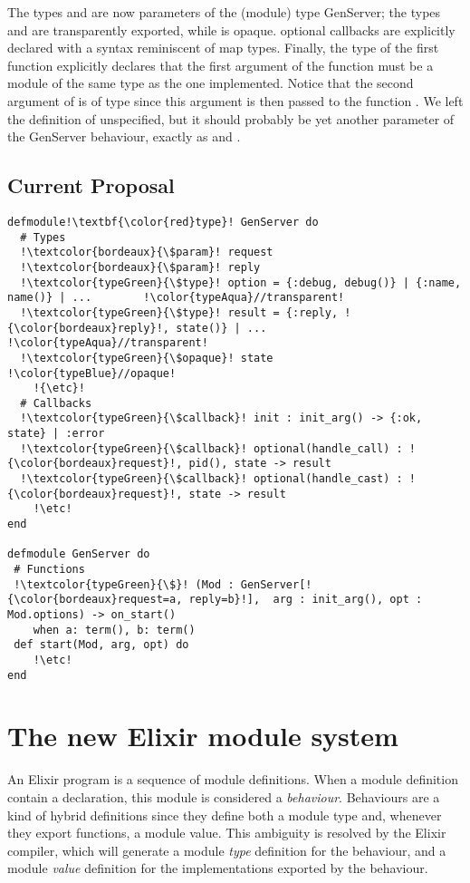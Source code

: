 \documentclass[a4paper,10pt]{article}
\begin{document}
The types  and  are now parameters of the (module) type GenServer; the types  and  are transparently exported, while  is opaque. optional callbacks are explicitly declared with a syntax reminiscent of map types. Finally, the type of the  first  function explicitly declares that the first argument of the  function must be a module of the same type as the one implemented. Notice that the second argument of  is of type  since this argument is then passed to the function . We left the definition of  unspecified, but it should probably be yet another parameter of the GenServer behaviour, exactly as   and .  



\subsection{Current Proposal}


\begin{verbatim}
defmodule!\textbf{\color{red}type}! GenServer do
  # Types
  !\textcolor{bordeaux}{\$param}! request
  !\textcolor{bordeaux}{\$param}! reply
  !\textcolor{typeGreen}{\$type}! option = {:debug, debug()} | {:name, name()} | ...        !\color{typeAqua}//transparent!
  !\textcolor{typeGreen}{\$type}! result = {:reply, !{\color{bordeaux}reply}!, state()} | ...                   !\color{typeAqua}//transparent!
  !\textcolor{typeGreen}{\$opaque}! state                                                   !\color{typeBlue}//opaque!
    !{\etc}!
  # Callbacks
  !\textcolor{typeGreen}{\$callback}! init : init_arg() -> {:ok, state} | :error      
  !\textcolor{typeGreen}{\$callback}! optional(handle_call) : !{\color{bordeaux}request}!, pid(), state -> result
  !\textcolor{typeGreen}{\$callback}! optional(handle_cast) : !{\color{bordeaux}request}!, state -> result        
    !\etc!
end

defmodule GenServer do
 # Functions
 !\textcolor{typeGreen}{\$}! (Mod : GenServer[!{\color{bordeaux}request=a, reply=b}!],  arg : init_arg(), opt : Mod.options) -> on_start()
    when a: term(), b: term()
 def start(Mod, arg, opt) do
    !\etc!
end
\end{verbatim}


\section{The new Elixir module system}
An Elixir program is a sequence of module definitions. When a module definition contain a  declaration, this module is considered a \emph{behaviour}. Behaviours are a kind of hybrid definitions since they define both a module type and, whenever they export functions, a module value. This ambiguity is resolved by the Elixir compiler, which will generate a module \emph{type} definition for the behaviour, and a module \emph{value} definition for the implementations exported by the behaviour.
\end{document}
